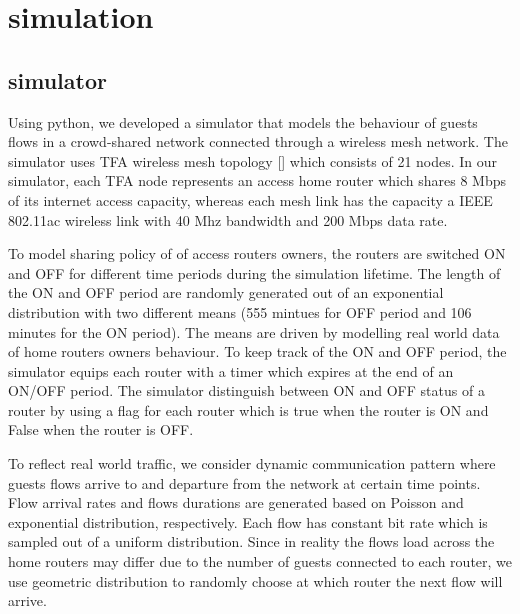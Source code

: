\section{simulation}
\label{sec:simulation}

\subsection{simulator}
Using python, we developed a simulator that models the behaviour of guests flows in a crowd-shared network connected through a wireless mesh network. The simulator uses TFA wireless mesh topology [] which consists of 21 nodes. In our simulator, each TFA node represents an access home router which shares 8 Mbps of its internet access capacity, whereas each mesh link has the capacity a IEEE 802.11ac wireless link with 40 Mhz bandwidth and 200 Mbps data rate. 

To model sharing policy of of access routers owners, the routers are switched ON and OFF for different time periods during the simulation lifetime. The length of the ON and OFF period are randomly generated out of an exponential distribution with two different means (555 mintues for OFF period and 106 minutes for the ON period). The means are driven by modelling real world data of home routers owners behaviour. To keep track of the ON and OFF period, the simulator equips each router with a timer which expires at the end of an ON/OFF period. The simulator distinguish between ON and OFF status of a router by using a flag for each router which is true when the router is ON and False when the router is OFF. 

To reflect real world traffic, we consider dynamic communication pattern where guests flows arrive to and departure from the network at certain time points. Flow arrival rates and flows durations are generated based on Poisson and exponential distribution, respectively. Each flow has constant bit rate which is sampled out of a uniform distribution. Since in reality the flows load across the home routers may differ due to the number of guests connected to each router, we use geometric distribution to randomly choose at which router the next flow will arrive. 

